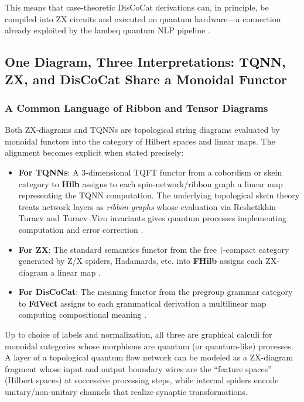 \documentclass[
]{article}
\providecommand{\tightlist}{%
  \setlength{\itemsep}{0pt}\setlength{\parskip}{0pt}}
\begin{document}
This means that case-theoretic DisCoCat derivations can, in principle,
be compiled into ZX circuits and executed on quantum hardware---a
connection already exploited by the lambeq quantum NLP pipeline
\citep{lorenz2021lambeq}.

\subsection{One Diagram, Three Interpretations: TQNN, ZX, and DisCoCat
Share a Monoidal
Functor}\label{one-diagram-three-interpretations-tqnn-zx-and-discocat-share-a-monoidal-functor}

\subsubsection{A Common Language of Ribbon and Tensor
Diagrams}\label{a-common-language-of-ribbon-and-tensor-diagrams}

Both ZX-diagrams and TQNNs are topological string diagrams evaluated by
monoidal functors into the category of Hilbert spaces and linear maps.
The alignment becomes explicit when stated precisely:

\begin{itemize}
\tightlist
\item
  \textbf{For TQNNs}: A 3-dimensional TQFT functor from a cobordism or
  skein category to \textbf{Hilb} assigns to each spin-network/ribbon
  graph a linear map representing the TQNN computation. The underlying
  topological skein theory treats network layers as \emph{ribbon graphs}
  whose evaluation via Reshetikhin--Turaev and Turaev--Viro invariants
  gives quantum processes implementing computation and error correction
  \citep{fields2022tqnn, fields2025amplituhedra}.
\item
  \textbf{For ZX}: The standard semantics functor from the free
  \(\dagger\)-compact category generated by Z/X spiders, Hadamards, etc.
  into \textbf{FHilb} assigns each ZX-diagram a linear map
  \citep{kissinger2020zx}.
\item
  \textbf{For DisCoCat}: The meaning functor from the pregroup grammar
  category to \textbf{FdVect} assigns to each grammatical derivation a
  multilinear map computing compositional meaning
  \citep{coecke2010mathematical}.
\end{itemize}

Up to choice of labels and normalization, all three are graphical
calculi for monoidal categories whose morphisms are quantum (or
quantum-like) processes. A layer of a topological quantum flow network
can be modeled as a ZX-diagram fragment whose input and output boundary
wires are the ``feature spaces'' (Hilbert spaces) at successive
processing steps, while internal spiders encode unitary/non-unitary
channels that realize synaptic transformations.
\end{document}
